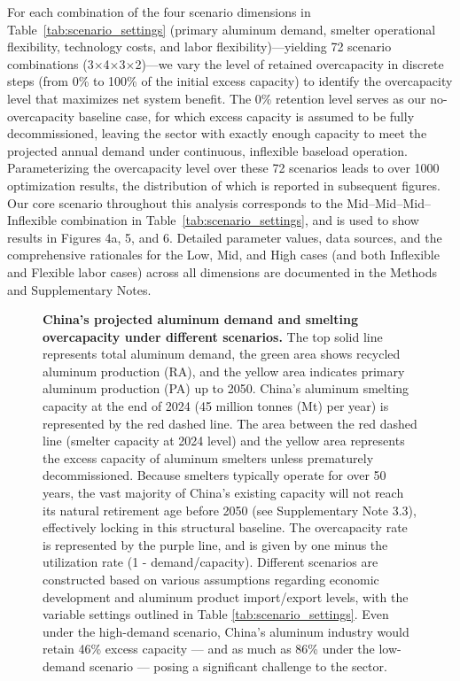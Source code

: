 \documentclass[preprint]{elsarticle}
\begin{document}
For each combination of the four scenario dimensions in Table~\ref{tab:scenario_settings} (primary aluminum demand, smelter operational flexibility, technology costs, and labor flexibility)—yielding 72 scenario combinations (3$\times$4$\times$3$\times$2)—we vary the level of retained overcapacity in discrete steps (from 0\% to 100\% of the initial excess capacity) to identify the overcapacity level that maximizes net system benefit. The 0\% retention level serves as our no-overcapacity baseline case, for which excess capacity is assumed to be fully decommissioned, leaving the sector with exactly enough capacity to meet the projected annual demand under continuous, inflexible baseload operation. Parameterizing the overcapacity level over these 72 scenarios leads to over 1000 optimization results, the distribution of which is reported in subsequent figures. Our core scenario throughout this analysis corresponds to the Mid--Mid--Mid--Inflexible combination in Table~\ref{tab:scenario_settings}, and is used to show results in Figures 4a, 5, and 6. Detailed parameter values, data sources, and the comprehensive rationales for the Low, Mid, and High cases (and both Inflexible and Flexible labor cases) across all dimensions are documented in the Methods and Supplementary Notes.

\begin{figure}[H]
\centering
\caption{\textbf{China's projected aluminum demand and smelting overcapacity under different scenarios.} The top solid line represents total aluminum demand, the green area shows recycled aluminum production (RA), and the yellow area indicates primary aluminum production (PA) up to 2050. China's aluminum smelting capacity at the end of 2024 (45 million tonnes (Mt) per year) is represented by the red dashed line. The area between the red dashed line (smelter capacity at 2024 level) and the yellow area represents the excess capacity of aluminum smelters unless prematurely decommissioned. Because smelters typically operate for over 50 years, the vast majority of China's existing capacity will not reach its natural retirement age before 2050 (see Supplementary Note 3.3), effectively locking in this structural baseline. The overcapacity rate is represented by the purple line, and is given by one minus the utilization rate (1 - demand/capacity). Different scenarios are constructed based on various assumptions regarding economic development and aluminum product import/export levels, with the variable settings outlined in Table \ref{tab:scenario_settings}. Even under the high-demand scenario, China's aluminum industry would retain 46\% excess capacity — and as much as 86\% under the low-demand scenario — posing a significant challenge to the sector.}
\label{fig_demand}
\end{figure}
\end{document}
